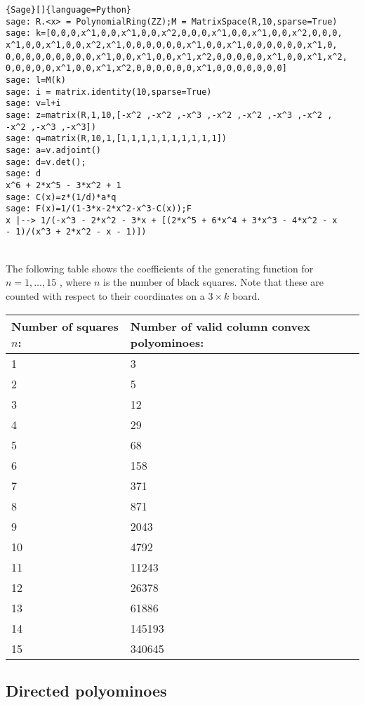 \documentclass[12pt]{report}
\begin{document}
{{{\begin{lstlisting}{Sage}[]{language=Python}
sage: R.<x> = PolynomialRing(ZZ);M = MatrixSpace(R,10,sparse=True)
sage: k=[0,0,0,x^1,0,0,x^1,0,0,x^2,0,0,0,x^1,0,0,x^1,0,0,x^2,0,0,0,
x^1,0,0,x^1,0,0,x^2,x^1,0,0,0,0,0,0,x^1,0,0,x^1,0,0,0,0,0,0,x^1,0,
0,0,0,0,0,0,0,0,0,x^1,0,0,x^1,0,0,x^1,x^2,0,0,0,0,0,x^1,0,0,x^1,x^2,
0,0,0,0,0,x^1,0,0,x^1,x^2,0,0,0,0,0,0,x^1,0,0,0,0,0,0,0]
sage: l=M(k)
sage: i = matrix.identity(10,sparse=True)
sage: v=l+i
sage: z=matrix(R,1,10,[-x^2 ,-x^2 ,-x^3 ,-x^2 ,-x^2 ,-x^3 ,-x^2 ,
-x^2 ,-x^3 ,-x^3])
sage: q=matrix(R,10,1,[1,1,1,1,1,1,1,1,1,1])
sage: a=v.adjoint()
sage: d=v.det();
sage: d
x^6 + 2*x^5 - 3*x^2 + 1
sage: C(x)=z*(1/d)*a*q
sage: F(x)=1/(1-3*x-2*x^2-x^3-C(x));F
x |--> 1/(-x^3 - 2*x^2 - 3*x + [(2*x^5 + 6*x^4 + 3*x^3 - 4*x^2 - x 
- 1)/(x^3 + 2*x^2 - x - 1)])
\end{lstlisting}} \quad \\

\noindent The following table shows the coefficients of the generating function for $n=1,\ldots,15$ , where $n$ is the number of black squares. Note that these are counted with respect to their coordinates on a $3\times k$ board.

\begin{center}
\begin{tabular}{ |p{3cm}|p{3cm}|  }
 \hline
 Number of squares 	$n$: & Number of valid column convex polyominoes: \\
 \hline
 1   & 3    \\
 2 &   5  \\
 3 & 12 \\
 4    & 29 \\
 5 &   68  \\
 6 & 158  \\
 7 & 371  \\
 8 & 871  \\
 9 & 2043  \\
 10 & 4792  \\
 11 & 11243  \\
 12 & 26378  \\
 13 & 61886  \\
 14 & 145193  \\
 15 & 340645  \\
 \hline
\end{tabular}
\end{center}



\subsection{Directed polyominoes}

}}
\end{document}
